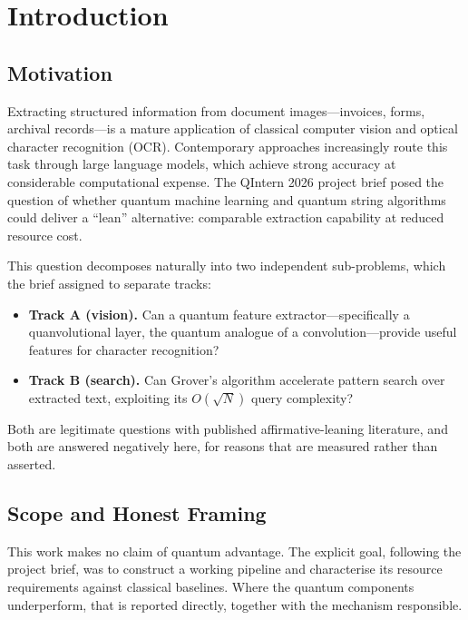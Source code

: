 \documentclass[11pt,a4paper]{article}
\begin{document}
\vspace{0.3cm}
\tableofcontents
\newpage

\section{Introduction}

\subsection{Motivation}

Extracting structured information from document images---invoices, forms,
archival records---is a mature application of classical computer vision and
optical character recognition (OCR). Contemporary approaches increasingly route
this task through large language models, which achieve strong accuracy at
considerable computational expense. The QIntern 2026 project brief posed the
question of whether quantum machine learning and quantum string algorithms could
deliver a ``lean'' alternative: comparable extraction capability at reduced
resource cost.

This question decomposes naturally into two independent sub-problems, which the
brief assigned to separate tracks:

\begin{itemize}
\item \textbf{Track A (vision).} Can a quantum feature extractor---specifically a
      quanvolutional layer, the quantum analogue of a convolution---provide
      useful features for character recognition?
\item \textbf{Track B (search).} Can Grover's algorithm accelerate pattern search
      over extracted text, exploiting its $O(\sqrt{N})$ query complexity?
\end{itemize}

Both are legitimate questions with published affirmative-leaning literature, and
both are answered negatively here, for reasons that are measured rather than
asserted.

\subsection{Scope and Honest Framing}

This work makes no claim of quantum advantage. The explicit goal, following the
project brief, was to construct a working pipeline and characterise its resource
requirements against classical baselines. Where the quantum components
underperform, that is reported directly, together with the mechanism
responsible.
\end{document}
